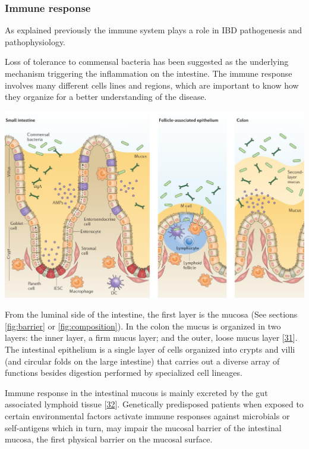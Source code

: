 \documentclass[
  a4paper,
]{book}
\let\origfigure\figure
\let\endorigfigure\endfigure
\renewenvironment{figure}[1][2] {
    \expandafter\origfigure\expandafter[!ht]
} {
    \endorigfigure
}
\begin{document}
\hypertarget{immune-response}{%
\subsubsection{Immune response}\label{immune-response}}

As explained previously the immune system plays a role in IBD pathogenesis and pathophysiology.

Loss of tolerance to commensal bacteria has been suggested as the underlying mechanism triggering the inflammation on the intestine.
The immune response involves many different cells lines and regions, which are important to know how they organize for a better understanding of the disease.

\begin{figure}
\includegraphics[width=1\linewidth]{images/tesis_AC_FigureX} \caption{The intestinal epithelial barrier.}\label{fig:barrier}
\end{figure}

From the luminal side of the intestine, the first layer is the mucosa (See sections \ref{fig:barrier} or \ref{fig:composition}).
In the colon the mucus is organized in two layers: the inner layer, a firm mucus layer; and the outer, loose mucus layer {[}\protect\hyperlink{ref-okumura2017}{31}{]}.
The intestinal epithelium is a single layer of cells organized into crypts and villi (and circular folds on the large intestine) that carries out a diverse array of functions besides digestion performed by specialized cell lineages.

Immune response in the intestinal mucous is mainly excreted by the gut associated lymphoid tissue {[}\protect\hyperlink{ref-faria2012}{32}{]}.
Genetically predisposed patients when exposed to certain environmental factors activate immune responses against microbials or self-antigens which in turn, may impair the mucosal barrier of the intestinal mucosa, the first physical barrier on the mucosal surface.
\end{document}
